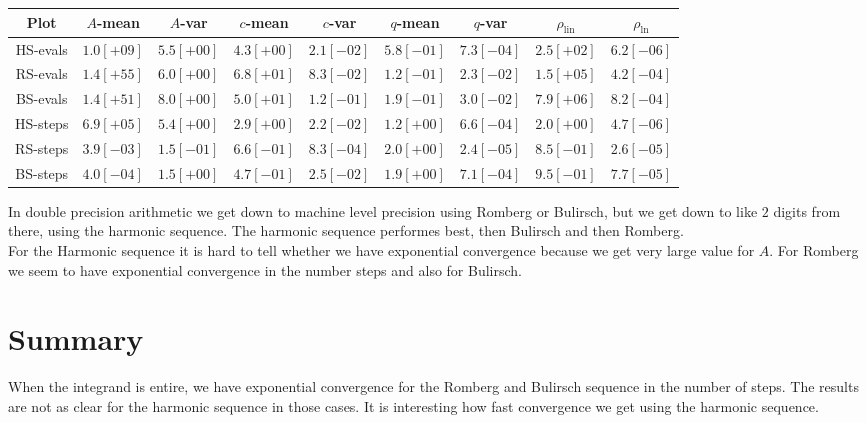 \begin{table}[H]
    \centering
    \small
    \begin{tabular}{c||c|c|c|c|c|c|c|c}
Plot & \(A\)-mean & \(A\)-var & \(c\)-mean & \(c\)-var & \(q\)-mean & \(q\)-var & \(\rho_{\operatorname{lin}}\) & \(\rho_{\ln}\)\\\hline
\rowcolor{yellow}
HS-evals & \(1.0[+09]\) & \(5.5[+00]\) & \(4.3[+00]\) & \(2.1[-02]\) & \(5.8[-01]\) & \(7.3[-04]\) & \(2.5[+02]\) & \(6.2[-06]\) \\
\rowcolor{red}
RS-evals & \(1.4[+55]\) & \(6.0[+00]\) & \(6.8[+01]\) & \(8.3[-02]\) & \(1.2[-01]\) & \(2.3[-02]\) & \(1.5[+05]\) & \(4.2[-04]\) \\
\rowcolor{red}
BS-evals & \(1.4[+51]\) & \(8.0[+00]\) & \(5.0[+01]\) & \(1.2[-01]\) & \(1.9[-01]\) & \(3.0[-02]\) & \(7.9[+06]\) & \(8.2[-04]\) \\
\rowcolor{yellow}
HS-steps & \(6.9[+05]\) & \(5.4[+00]\) & \(2.9[+00]\) & \(2.2[-02]\) & \(1.2[+00]\) & \(6.6[-04]\) & \(2.0[+00]\) & \(4.7[-06]\) \\
\rowcolor{green}
RS-steps & \(3.9[-03]\) & \(1.5[-01]\) & \(6.6[-01]\) & \(8.3[-04]\) & \(2.0[+00]\) & \(2.4[-05]\) & \(8.5[-01]\) & \(2.6[-05]\) \\
\rowcolor{green}
BS-steps & \(4.0[-04]\) & \(1.5[+00]\) & \(4.7[-01]\) & \(2.5[-02]\) & \(1.9[+00]\) & \(7.1[-04]\) & \(9.5[-01]\) & \(7.7[-05]\) \\
    \end{tabular}
    \label{tab:my_label}
\end{table}

In double precision arithmetic we get down to machine level precision using Romberg or Bulirsch, but we get down to like \(2\) digits from there, using the harmonic sequence. The harmonic sequence performes best, then Bulirsch and then Romberg.\\

For the Harmonic sequence it is hard to tell whether we have exponential convergence because we get very large value for \(A\). For Romberg we seem to have exponential convergence in the number steps and also for Bulirsch.

\section{Summary}

When the integrand is entire, we have exponential convergence for the Romberg and Bulirsch sequence in the number of steps. The results are not as clear for the harmonic sequence in those cases. It is interesting how fast convergence we get using the harmonic sequence.\\

